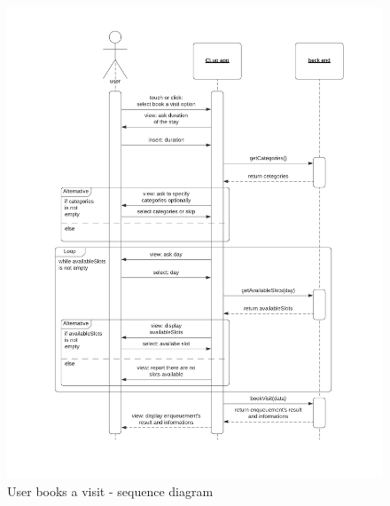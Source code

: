 \begin{figure}[h!]
    \centering
    \includegraphics[width=\textwidth]{Images/sequencediagrams/UserbooksavisitSD.png}
    \caption{\label{fig:userbookavisit}User books a visit - sequence diagram}
\end{figure}

